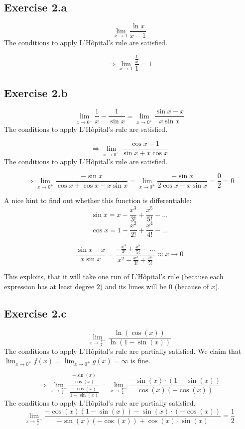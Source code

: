 \documentclass[a4paper]{article}
\theoremstyle{definition}
\begin{document}
\subsection{Exercise 2.a}
%
\[ \lim_{x\to1} \frac{\ln{x}}{x - 1} \]
The conditions to apply L'H\^opital's rule are satisfied.

\[ \Rightarrow \lim_{x\to1} \frac{\frac{1}{x}}{1} = 1 \]

\subsection{Exercise 2.b}
%
\[ \lim_{x\to0^+} \frac{1}{x} - \frac{1}{\sin{x}} = \lim_{x\to0^+} \frac{\sin{x} - x}{x \sin{x}} \]
The conditions to apply L'H\^opital's rule are satisfied.

\[ \Rightarrow \lim_{x\to0^+} \frac{\cos{x} - 1}{\sin{x} + x \cos{x}} \]
The conditions to apply L'H\^opital's rule are satisfied.

\[ \Rightarrow \lim_{x\to0^+} \frac{-\sin{x}}{\cos{x} + \cos{x} - x \sin{x}} = \lim_{x\to0^+} \frac{-\sin{x}}{2 \cos{x} - x \sin{x}} = \frac02 = 0 \]

A nice hint to find out whether this function is differentiable:
\[ \sin{x} = x - \frac{x^3}{3!} + \frac{x^5}{5!} - \ldots \]
\[ \cos{x} = 1 - \frac{x^2}{2!} + \frac{x^4}{4!} - \ldots \]

\[ \frac{\sin{x} - x}{x \sin{x}} = \frac{-\frac{x^3}{3!} + \frac{x^5}{5!} - \ldots}{x^2 - \frac{x^4}{3!} + \frac{x^6}{5!}} \approx x \to 0 \]

This exploits, that it will take one run of L'H\^opital's rule (because each expression has at least degree $2$) and its limes will be 0 (because of $x$).

\subsection{Exercise 2.c}
%
\[ \lim_{x\to\frac\pi2^-} \frac{\ln(\cos(x))}{\ln(1 - \sin(x))} \]
The conditions to apply L'H\^opital's rule are partially satisfied.
We claim that $\lim_{x\to0^+} f(x) = \lim_{x\to0^+} g(x) = \infty$ is fine.

\[
  \Rightarrow \lim_{x\to\frac\pi2^-} \frac{\frac{-\sin(x)}{\cos(x)}}{\frac{-\cos(x)}{1 - \sin(x)}}
  = \lim_{x\to\frac\pi2^-} \frac{-\sin(x) \cdot \left(1 - \sin(x)\right)}{\cos(x)(-\cos(x))}
\]
The conditions to apply L'H\^opital's rule are partially satisfied.
\[
  \lim_{x\to\frac\pi2^-} \frac{-\cos(x)(1 - \sin(x)) - \sin(x) \cdot (-\cos(x))}{-\sin(x) (-\cos(x)) + \cos(x) \cdot \sin(x)} = \frac12
\]
\end{document}
